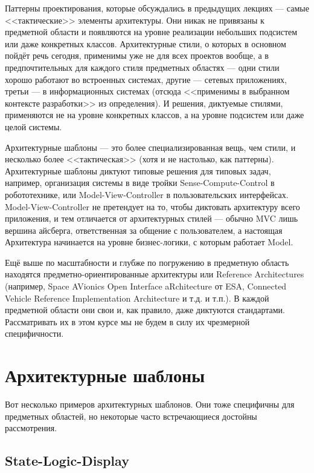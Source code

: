 \documentclass[a5paper]{article}
\begin{document}
Паттерны проектирования, которые обсуждались в предыдущих лекциях --- самые <<тактические>> элементы архитектуры. Они никак не привязаны к предметной области и появляются на уровне реализации небольших подсистем или даже конкретных классов. Архитектурные стили, о которых в основном пойдёт речь сегодня, применимы уже не для всех проектов вообще, а в предпочтительных для каждого стиля предметных областях --- одни стили хорошо работают во встроенных системах, другие --- сетевых приложениях, третьи --- в информационных системах (отсюда <<применимы в выбранном контексте разработки>> из определения). И решения, диктуемые стилями, применяются не на уровне конкретных классов, а на уровне подсистем или даже целой системы.

Архитектурные шаблоны --- это более специализированная вещь, чем стили, и несколько более <<тактическая>> (хотя и не настолько, как паттерны). Архитектурные шаблоны диктуют типовые решения для типовых задач, например, организация системы в виде тройки Sense-Compute-Control в робототехнике, или Model-View-Controller в пользовательских интерфейсах. Model-View-Controller не претендует на то, чтобы диктовать архитектуру всего приложения, и тем отличается от архитектурных стилей --- обычно MVC лишь вершина айсберга, ответственная за общение с пользователем, а настоящая Архитектура начинается на уровне бизнес-логики, с которым работает Model.

Ещё выше по масштабности и глубже по погружению в предметную область находятся предметно-ориентированные архитектуры или Reference Architectures (например, Space AVionics Open Interface aRchitecture от ESA, Connected Vehicle Reference Implementation Architecture и т.д. и т.п.). В каждой предметной области они свои и, как правило, даже диктуются стандартами. Рассматривать их в этом курсе мы не будем в силу их чрезмерной специфичности.

\section{Архитектурные шаблоны}

Вот несколько примеров архитектурных шаблонов. Они тоже специфичны для предметных областей, но некоторые часто встречающиеся достойны рассмотрения.

\subsection{State-Logic-Display}
\end{document}
